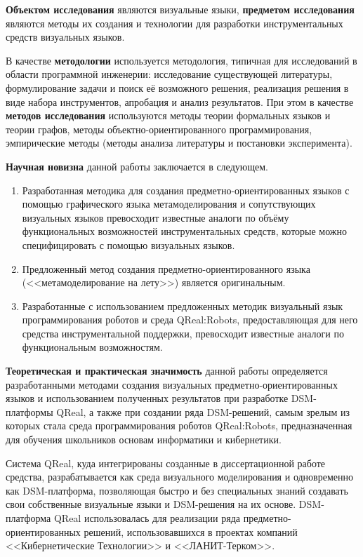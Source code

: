 \textbf{Объектом исследования} являются визуальные языки, \textbf{предметом исследования} 
являются методы их создания и технологии для разработки инструментальных средств визуальных языков.

В качестве \textbf{методологии} используется методология, типичная для исследований в 
области программной инженерии: исследование существующей литературы, формулирование задачи 
и поиск её возможного решения, реализация решения в виде набора инструментов, апробация 
и анализ результатов. При этом в качестве \textbf{методов исследования} используются 
методы теории формальных языков и теории графов, методы объектно-ориентированного программирования, 
эмпирические методы (методы анализа литературы и постановки эксперимента).

\textbf{Научная новизна} данной работы заключается в следующем.
\begin{enumerate}
	\item Разработанная методика для создания предметно-ориентированных языков с помощью 
		графического языка метамоделирования и сопутствующих визуальных языков превосходит 
		известные аналоги по объёму функциональных возможностей инструментальных средств, 
		которые можно специфицировать с помощью визуальных языков.
	\item Предложенный метод создания предметно-ориентированного языка (<<метамоделирование на лету>>)
	является оригинальным. 
	\item Разработанные с использованием предложенных методик визуальный язык программирования роботов 
		и среда QReal:Robots, предоставляющая для него средства инструментальной поддержки, 
		превосходит известные аналоги по функциональным возможностям.
\end{enumerate}

\textbf{Теоретическая и практическая значимость} данной работы определяется разработанными 
методами создания визуальных предметно-ориентированных языков и использованием полученных 
результатов при разработке DSM-платформы QReal, а также при создании ряда DSM-решений, 
самым зрелым из которых стала среда программирования роботов QReal:Robots, 
предназначенная для обучения школьников основам информатики и кибернетики.

Система QReal, куда интегрированы созданные в диссертационной работе средства, разрабатывается 
как среда визуального моделирования и одновременно как DSM-платформа, 
позволяющая быстро и без специальных знаний создавать свои собственные 
визуальные языки и DSM-решения на их основе. DSM-платформа QReal использовалась
для реализации ряда предметно-ориентированных решений, использовавшихся в 
проектах компаний <<Кибернетические Технологии>> и <<ЛАНИТ-Терком>>.

